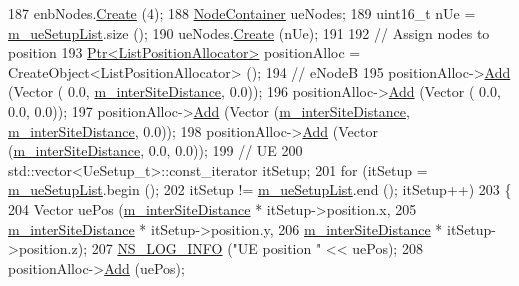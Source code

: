 \begin{DoxyCode}
187   enbNodes.\hyperlink{classns3_1_1NodeContainer_a787f059e2813e8b951cc6914d11dfe69}{Create} (4);
188   \hyperlink{classns3_1_1NodeContainer}{NodeContainer} ueNodes;
189   uint16\_t nUe = \hyperlink{classLteCellSelectionTestCase_a09e2b5bfbe6cd4fbd482dde48078a8c7}{m\_ueSetupList}.size ();
190   ueNodes.\hyperlink{classns3_1_1NodeContainer_a787f059e2813e8b951cc6914d11dfe69}{Create} (nUe);
191 
192   \textcolor{comment}{// Assign nodes to position}
193   \hyperlink{classns3_1_1Ptr}{Ptr<ListPositionAllocator>} positionAlloc = CreateObject<ListPositionAllocator> 
      ();
194   \textcolor{comment}{// eNodeB}
195   positionAlloc->\hyperlink{classns3_1_1ListPositionAllocator_a460e82f015ac012a73ba0ea0cccb3486}{Add} (Vector (                0.0, \hyperlink{classLteCellSelectionTestCase_a71bd16bea626b264efb219eaed8af84c}{m\_interSiteDistance}, 0.0));
196   positionAlloc->\hyperlink{classns3_1_1ListPositionAllocator_a460e82f015ac012a73ba0ea0cccb3486}{Add} (Vector (                0.0,                 0.0, 0.0));
197   positionAlloc->\hyperlink{classns3_1_1ListPositionAllocator_a460e82f015ac012a73ba0ea0cccb3486}{Add} (Vector (\hyperlink{classLteCellSelectionTestCase_a71bd16bea626b264efb219eaed8af84c}{m\_interSiteDistance}, 
      \hyperlink{classLteCellSelectionTestCase_a71bd16bea626b264efb219eaed8af84c}{m\_interSiteDistance}, 0.0));
198   positionAlloc->\hyperlink{classns3_1_1ListPositionAllocator_a460e82f015ac012a73ba0ea0cccb3486}{Add} (Vector (\hyperlink{classLteCellSelectionTestCase_a71bd16bea626b264efb219eaed8af84c}{m\_interSiteDistance},                 0.0, 0.0));
199   \textcolor{comment}{// UE}
200   std::vector<UeSetup\_t>::const\_iterator itSetup;
201   \textcolor{keywordflow}{for} (itSetup = \hyperlink{classLteCellSelectionTestCase_a09e2b5bfbe6cd4fbd482dde48078a8c7}{m\_ueSetupList}.begin ();
202        itSetup != \hyperlink{classLteCellSelectionTestCase_a09e2b5bfbe6cd4fbd482dde48078a8c7}{m\_ueSetupList}.end (); itSetup++)
203     \{
204       Vector uePos (\hyperlink{classLteCellSelectionTestCase_a71bd16bea626b264efb219eaed8af84c}{m\_interSiteDistance} * itSetup->position.x,
205                     \hyperlink{classLteCellSelectionTestCase_a71bd16bea626b264efb219eaed8af84c}{m\_interSiteDistance} * itSetup->position.y,
206                     \hyperlink{classLteCellSelectionTestCase_a71bd16bea626b264efb219eaed8af84c}{m\_interSiteDistance} * itSetup->position.z);
207       \hyperlink{group__logging_gafbd73ee2cf9f26b319f49086d8e860fb}{NS\_LOG\_INFO} (\textcolor{stringliteral}{"UE position "} << uePos);
208       positionAlloc->\hyperlink{classns3_1_1ListPositionAllocator_a460e82f015ac012a73ba0ea0cccb3486}{Add} (uePos);

\end{DoxyCode}
